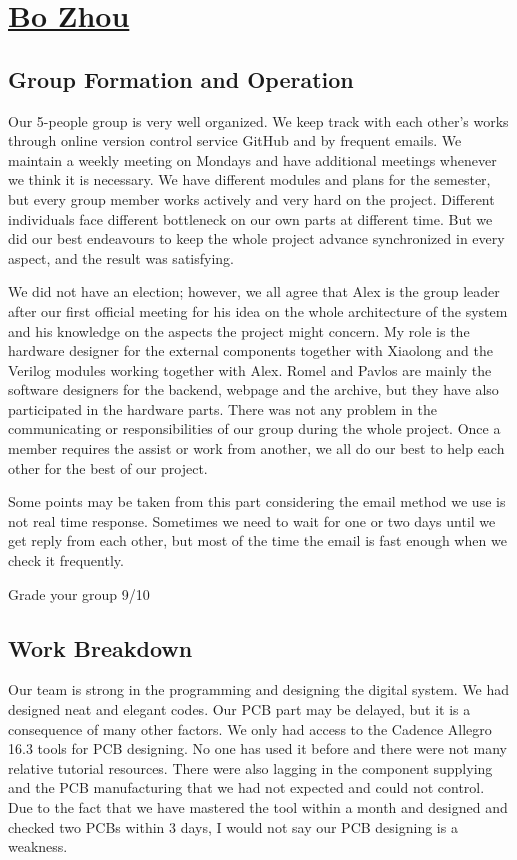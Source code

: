 \section{\texorpdfstring{\href{mailto:bz1g11@ecs.soton.ac.uk}{Bo Zhou}} {Bo Zhou}}


\subsection{Group Formation and Operation}

Our 5-people group is very well organized. We keep track with each other’s works through online version control service GitHub and by frequent emails. We maintain a weekly meeting on Mondays and have additional meetings whenever we think it is necessary. We have different modules and plans for the semester, but every group member works actively and very hard on the project. Different individuals face different bottleneck on our own parts at different time. But we did our best endeavours to keep the whole project advance synchronized in every aspect, and the result was satisfying.

We did not have an election; however, we all agree that Alex is the group leader after our first official meeting for his idea on the whole architecture of the system and his knowledge on the aspects the project might concern. My role is the hardware designer for the external components together with Xiaolong and the Verilog modules working together with Alex. Romel and Pavlos are mainly the software designers for the backend, webpage and the archive, but they have also participated in the hardware parts. There was not any problem in the communicating or responsibilities of our group during the whole project. Once a member requires the assist or work from another, we all do our best to help each other for the best of our project.

Some points may be taken from this part considering the email method we use is not real time response. Sometimes we need to wait for one or two days until we get reply from each other, but most of the time the email is fast enough when we check it frequently.

Grade your group	9/10



\subsection{Work Breakdown}

Our team is strong in the programming and designing the digital system. We had designed neat and elegant codes. Our PCB part may be delayed, but it is a consequence of many other factors. We only had access to the Cadence Allegro 16.3 tools for PCB designing. No one has used it before and there were not many relative tutorial resources. There were also lagging in the component supplying and the PCB manufacturing that we had not expected and could not control. Due to the fact that we have mastered the tool within a month and designed and checked two PCBs within 3 days, I would not say our PCB designing is a weakness.

